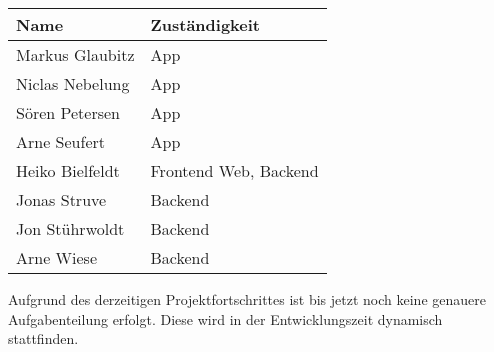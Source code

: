 \begin{tabular}{ll}
 \rowcolor[HTML]{E7E7E7} 
 \textbf{Name} & \textbf{Zuständigkeit} \\ \hline
 Markus Glaubitz & App \\ 
 \rowcolor[HTML]{E7E7E7} 
 Niclas Nebelung & App \\ 
 Sören Petersen & App \\ 
 \rowcolor[HTML]{E7E7E7} 
 Arne Seufert & App \\ 
 Heiko Bielfeldt & Frontend Web, Backend \\ 
 \rowcolor[HTML]{E7E7E7}
 Jonas Struve &  Backend \\ 
 Jon Stührwoldt & Backend \\ 
 \rowcolor[HTML]{E7E7E7}
 Arne Wiese & Backend \\ 
\end{tabular}

\bigskip

Aufgrund des derzeitigen Projektfortschrittes ist bis jetzt noch keine genauere Aufgabenteilung erfolgt. Diese wird in der Entwicklungszeit dynamisch stattfinden.\\